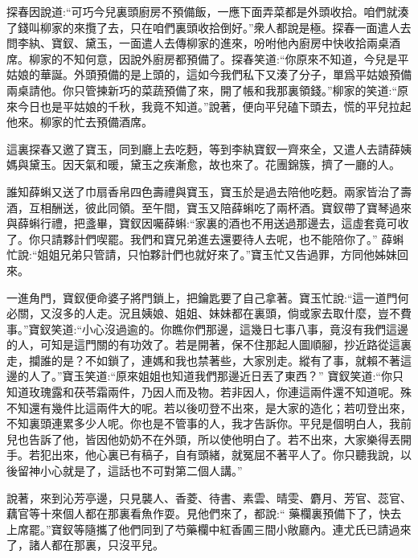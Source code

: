 \begin{parag}
    探春因說道:“可巧今兒裏頭廚房不預備飯，一應下面弄菜都是外頭收拾。咱們就湊了錢叫柳家的來攬了去，只在咱們裏頭收拾倒好。”衆人都說是極。探春一面遣人去問李紈、寶釵、黛玉，一面遣人去傳柳家的進來，吩咐他內廚房中快收拾兩桌酒席。柳家的不知何意，因說外廚房都預備了。探春笑道:“你原來不知道，今兒是平姑娘的華誕。外頭預備的是上頭的，這如今我們私下又湊了分子，單爲平姑娘預備兩桌請他。你只管揀新巧的菜蔬預備了來，開了帳和我那裏領錢。”柳家的笑道:“原來今日也是平姑娘的千秋，我竟不知道。”說著，便向平兒磕下頭去，慌的平兒拉起他來。柳家的忙去預備酒席。
\end{parag}


\begin{parag}
    這裏探春又邀了寶玉，同到廳上去吃麪，等到李紈寶釵一齊來全，又遣人去請薛姨媽與黛玉。因天氣和暖，黛玉之疾漸愈，故也來了。花團錦簇，擠了一廳的人。
\end{parag}


\begin{parag}
    誰知薛蝌又送了巾扇香帛四色壽禮與寶玉，寶玉於是過去陪他吃麪。兩家皆治了壽酒，互相酬送，彼此同領。至午間，寶玉又陪薛蝌吃了兩杯酒。寶釵帶了寶琴過來與薛蝌行禮，把盞畢，寶釵因囑薛蝌:“家裏的酒也不用送過那邊去，這虛套竟可收了。你只請夥計們喫罷。我們和寶兄弟進去還要待人去呢，也不能陪你了。” 薛蝌忙說:“姐姐兄弟只管請，只怕夥計們也就好來了。”寶玉忙又告過罪，方同他姊妹回來。
\end{parag}


\begin{parag}
    一進角門，寶釵便命婆子將門鎖上，把鑰匙要了自己拿著。寶玉忙說:“這一道門何必關，又沒多的人走。況且姨娘、姐姐、妹妹都在裏頭，倘或家去取什麼，豈不費事。”寶釵笑道:“小心沒過逾的。你瞧你們那邊，這幾日七事八事，竟沒有我們這邊的人，可知是這門關的有功效了。若是開著，保不住那起人圖順腳，抄近路從這裏走，攔誰的是？不如鎖了，連媽和我也禁著些，大家別走。縱有了事，就賴不著這邊的人了。”寶玉笑道:“原來姐姐也知道我們那邊近日丟了東西？” 寶釵笑道:“你只知道玫瑰露和茯苓霜兩件，乃因人而及物。若非因人，你連這兩件還不知道呢。殊不知還有幾件比這兩件大的呢。若以後叨登不出來，是大家的造化；若叨登出來，不知裏頭連累多少人呢。你也是不管事的人，我才告訴你。平兒是個明白人，我前兒也告訴了他，皆因他奶奶不在外頭，所以使他明白了。若不出來，大家樂得丟開手。若犯出來，他心裏已有稿子，自有頭緒，就冤屈不著平人了。你只聽我說，以後留神小心就是了，這話也不可對第二個人講。”
\end{parag}


\begin{parag}
    說著，來到沁芳亭邊，只見襲人、香菱、待書、素雲、晴雯、麝月、芳官、蕊官、藕官等十來個人都在那裏看魚作耍。見他們來了，都說:“ 藥欄裏預備下了，快去上席罷。”寶釵等隨攜了他們同到了芍藥欄中紅香圃三間小敞廳內。連尤氏已請過來了，諸人都在那裏，只沒平兒。
\end{parag}


